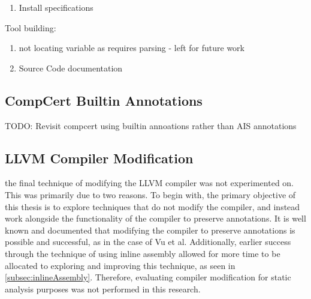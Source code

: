 \begin{enumerate}
    \item Install specifications
\end{enumerate}

Tool building:
\begin{enumerate}
    \item not locating variable as requires parsing - left for future work
    \item Source Code documentation
\end{enumerate}

\clearpage

\subsection{CompCert Builtin Annotations}
TODO: Revisit compcert using builtin annoations rather than AIS annotations

\subsection{LLVM Compiler Modification}
the final technique of modifying the LLVM compiler was not experimented on. This was primarily due to two reasons. To begin with, the primary objective of this thesis is to explore techniques that do not modify the compiler, and instead work alongside the functionality of the compiler to preserve annotations. It is well known and documented that modifying the compiler to preserve annotations is possible and successful, as in the case of Vu et al. \cite{vu2020secure} Additionally, earlier success through the technique of using inline assembly allowed for more time to be allocated to exploring and improving this technique, as seen in \ref{subsec:inlineAssembly}. Therefore, evaluating compiler modification for static analysis purposes was not performed in this research.

